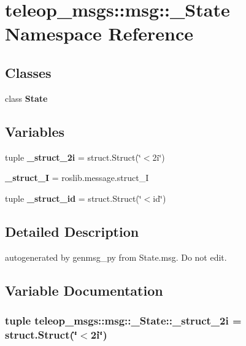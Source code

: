 \section{teleop\_\-msgs::msg::\_\-State Namespace Reference}
\label{namespaceteleop__msgs_1_1msg_1_1__State}
\subsection*{Classes}
\begin{DoxyCompactItemize}
\item 
class {\bf State}
\end{DoxyCompactItemize}
\subsection*{Variables}
\begin{DoxyCompactItemize}
\item 
tuple {\bf \_\-struct\_\-2i} = struct.Struct(\char`\"{}$<$2i\char`\"{})
\item 
{\bf \_\-struct\_\-I} = roslib.message.struct\_\-I
\item 
tuple {\bf \_\-struct\_\-id} = struct.Struct(\char`\"{}$<$id\char`\"{})
\end{DoxyCompactItemize}


\subsection{Detailed Description}
\begin{DoxyVerb}autogenerated by genmsg_py from State.msg. Do not edit.\end{DoxyVerb}
 

\subsection{Variable Documentation}
\subsubsection[{\_\-struct\_\-2i}]{\setlength{\rightskip}{0pt plus 5cm}tuple {\bf teleop\_\-msgs::msg::\_\-State::\_\-struct\_\-2i} = struct.Struct(\char`\"{}$<$2i\char`\"{})}\label{namespaceteleop__msgs_1_1msg_1_1__State_a99f4ca12de0faf2ea040818854aaf8cf}


